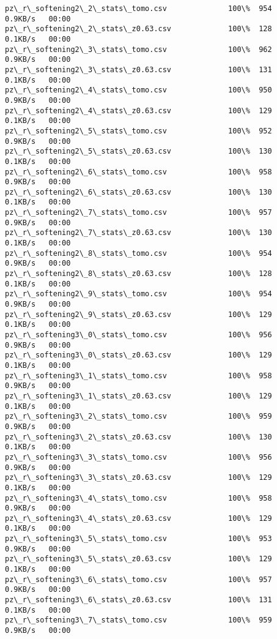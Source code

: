 \documentclass[11pt]{article}
\begin{document}
\begin{Verbatim}[commandchars=\\\{\}]
pz\_r\_softening2\_2\_stats\_tomo.csv              100\%  954     0.9KB/s   00:00    
pz\_r\_softening2\_2\_stats\_z0.63.csv             100\%  128     0.1KB/s   00:00    
pz\_r\_softening2\_3\_stats\_tomo.csv              100\%  962     0.9KB/s   00:00    
pz\_r\_softening2\_3\_stats\_z0.63.csv             100\%  131     0.1KB/s   00:00    
pz\_r\_softening2\_4\_stats\_tomo.csv              100\%  950     0.9KB/s   00:00    
pz\_r\_softening2\_4\_stats\_z0.63.csv             100\%  129     0.1KB/s   00:00    
pz\_r\_softening2\_5\_stats\_tomo.csv              100\%  952     0.9KB/s   00:00    
pz\_r\_softening2\_5\_stats\_z0.63.csv             100\%  130     0.1KB/s   00:00    
pz\_r\_softening2\_6\_stats\_tomo.csv              100\%  958     0.9KB/s   00:00    
pz\_r\_softening2\_6\_stats\_z0.63.csv             100\%  130     0.1KB/s   00:00    
pz\_r\_softening2\_7\_stats\_tomo.csv              100\%  957     0.9KB/s   00:00    
pz\_r\_softening2\_7\_stats\_z0.63.csv             100\%  130     0.1KB/s   00:00    
pz\_r\_softening2\_8\_stats\_tomo.csv              100\%  954     0.9KB/s   00:00    
pz\_r\_softening2\_8\_stats\_z0.63.csv             100\%  128     0.1KB/s   00:00    
pz\_r\_softening2\_9\_stats\_tomo.csv              100\%  954     0.9KB/s   00:00    
pz\_r\_softening2\_9\_stats\_z0.63.csv             100\%  129     0.1KB/s   00:00    
pz\_r\_softening3\_0\_stats\_tomo.csv              100\%  956     0.9KB/s   00:00    
pz\_r\_softening3\_0\_stats\_z0.63.csv             100\%  129     0.1KB/s   00:00    
pz\_r\_softening3\_1\_stats\_tomo.csv              100\%  958     0.9KB/s   00:00    
pz\_r\_softening3\_1\_stats\_z0.63.csv             100\%  129     0.1KB/s   00:00    
pz\_r\_softening3\_2\_stats\_tomo.csv              100\%  959     0.9KB/s   00:00    
pz\_r\_softening3\_2\_stats\_z0.63.csv             100\%  130     0.1KB/s   00:00    
pz\_r\_softening3\_3\_stats\_tomo.csv              100\%  956     0.9KB/s   00:00    
pz\_r\_softening3\_3\_stats\_z0.63.csv             100\%  129     0.1KB/s   00:00    
pz\_r\_softening3\_4\_stats\_tomo.csv              100\%  958     0.9KB/s   00:00    
pz\_r\_softening3\_4\_stats\_z0.63.csv             100\%  129     0.1KB/s   00:00    
pz\_r\_softening3\_5\_stats\_tomo.csv              100\%  953     0.9KB/s   00:00    
pz\_r\_softening3\_5\_stats\_z0.63.csv             100\%  129     0.1KB/s   00:00    
pz\_r\_softening3\_6\_stats\_tomo.csv              100\%  957     0.9KB/s   00:00    
pz\_r\_softening3\_6\_stats\_z0.63.csv             100\%  131     0.1KB/s   00:00    
pz\_r\_softening3\_7\_stats\_tomo.csv              100\%  959     0.9KB/s   00:00    

\end{Verbatim}
\end{document}
